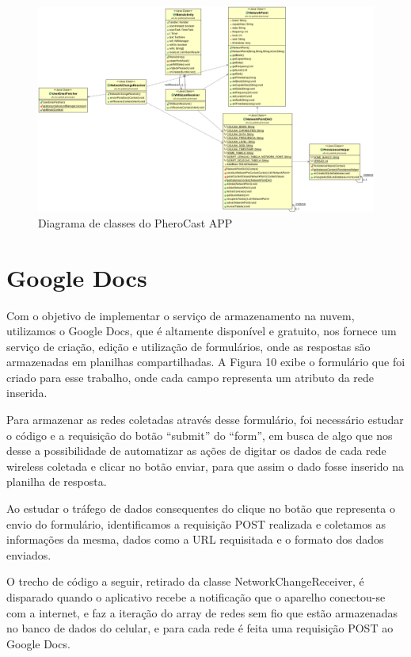 \documentclass[12pt, %
openright, 
oneside,
a4paper,
brazil]{facom-ufu-abntex2}
\begin{document}
  \begin{figure}[hbt]
  \includegraphics [scale=.3] {diagrama}
  \caption{Diagrama de classes do PheroCast APP}
\end{figure}
  

 \section{Google Docs}
Com o objetivo de implementar o serviço de armazenamento na nuvem, utilizamos o Google Docs, que é altamente disponível e gratuito, nos fornece um serviço de criação, edição e utilização de formulários, onde as respostas são armazenadas em planilhas compartilhadas. A Figura 10 exibe o formulário que foi criado para esse trabalho, onde cada campo representa um atributo da rede inserida.

Para armazenar as redes coletadas através desse formulário, foi necessário estudar o código e a requisição do botão ``submit'' do ``form'', em busca de algo que nos desse a possibilidade de automatizar as ações de digitar os dados de cada rede wireless coletada e clicar no botão enviar, para que assim o dado fosse inserido na planilha de resposta.

Ao estudar o tráfego de dados consequentes do clique no botão que representa o envio do formulário, identificamos a requisição POST realizada e coletamos as informações da mesma, dados como a URL requisitada e o formato dos dados enviados. 

O trecho de código a seguir, retirado da classe NetworkChangeReceiver, é disparado quando o aplicativo recebe a notificação que o aparelho conectou-se com a internet, e faz a iteração do array de redes sem fio que estão armazenadas no banco de dados do celular, e para cada rede é feita uma requisição POST ao Google Docs.
\end{document}
